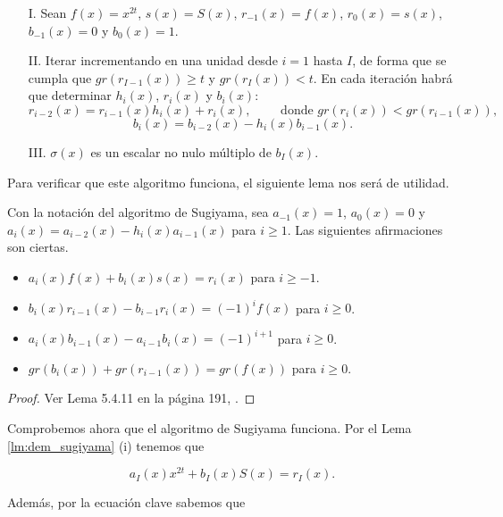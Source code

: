 \begin{itemize}
    \item[I.] Sean $f(x) = x^{2t}$, $s(x) = S(x)$, $r_{-1}(x) = f(x)$, $r_0(x) = s(x)$, $b_{-1}(x) = 0$ y $b_0(x) = 1$.
    \item[II.] Iterar incrementando en una unidad desde $i = 1$ hasta $I$, de forma que se cumpla que $gr(r_{I-1}(x)) \geq t$ y $gr(r_I(x)) < t$. En cada iteración habrá que determinar $h_i(x)$, $r_i(x)$ y $b_i(x)$:
        $$r_{i-2}(x) = r_{i-1}(x) h_i(x) + r_i (x), \qquad \text{ donde } gr(r_i(x)) < gr(r_{i-1}(x)),$$
        $$b_i(x) = b_{i-2}(x) - h_i(x) b_{i-1}(x).$$
    \item[III.] $\sigma(x)$ es un escalar no nulo múltiplo de $b_I(x)$. 
\end{itemize}

Para verificar que este algoritmo funciona, el siguiente lema nos será de utilidad.

\begin{lemma}
    \label{lm:dem_sugiyama}
    Con la notación del algoritmo de Sugiyama, sea $a_{-1}(x) = 1$, $a_0(x) = 0$ y $a_i(x) = a_{i-2}(x) - h_i(x) a_{i-1}(x)$ para $i \geq 1$. Las siguientes afirmaciones son ciertas.

    \begin{itemize}
        \item $a_i(x) f(x) + b_i(x) s(x) = r_i (x)$ para $i \geq -1$.
        \item $b_i(x) r_{i-1}(x) - b_{i-1} r_i(x) = (-1)^i f(x)$ para $i \geq 0$.
        \item $a_i(x) b_{i-1}(x) - a_{i-1} b_i (x) = (-1)^{i+1}$ para $i \geq 0$.
        \item $gr(b_i(x)) + gr(r_{i-1}(x)) = gr(f(x))$ para $i \geq 0$.
    \end{itemize}
\end{lemma}

\begin{proof}
    Ver Lema 5.4.11 en la página 191, \cite{Huffman_Pless_2010}.
\end{proof}

Comprobemos ahora que el algoritmo de Sugiyama funciona. Por el Lema \ref{lm:dem_sugiyama} (i) tenemos que

\begin{equation}
    \label{dem:sugiyama_relacion}
    a_I(x) x^{2t} + b_I(x) S(x) = r_I(x).
\end{equation}

Además, por la ecuación clave sabemos que

